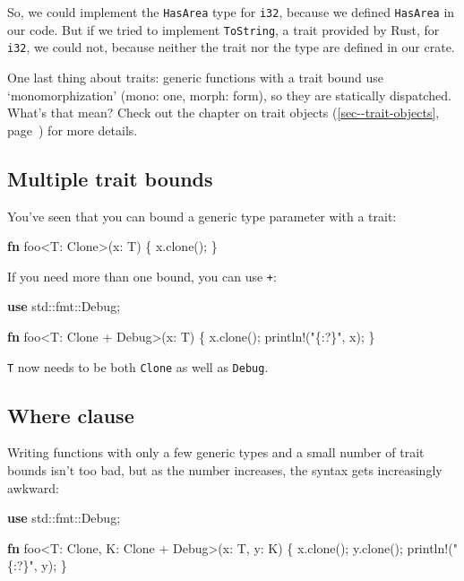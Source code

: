 \documentclass[a4paper,]{book}
\renewcommand*{\hyperref}[2][\ar]{%
  \def\ar{#2}%
  #2 (\autoref{#1}, page~\pageref{#1})}
\newenvironment{Shaded}{\begin{snugshade}}{\end{snugshade}}
\newcommand{\KeywordTok}[1]{\textcolor[rgb]{0.13,0.29,0.53}{\textbf{{#1}}}}
\newcommand{\StringTok}[1]{\textcolor[rgb]{0.31,0.60,0.02}{{#1}}}
\newcommand{\OtherTok}[1]{\textcolor[rgb]{0.56,0.35,0.01}{{#1}}}
\newcommand{\NormalTok}[1]{{#1}}
\begin{document}
So, we could implement the \texttt{HasArea} type for \texttt{i32},
because we defined \texttt{HasArea} in our code. But if we tried to
implement \texttt{ToString}, a trait provided by Rust, for \texttt{i32},
we could not, because neither the trait nor the type are defined in our
crate.

One last thing about traits: generic functions with a trait bound use
`monomorphization' (mono: one, morph: form), so they are statically
dispatched. What's that mean? Check out the chapter on
\hyperref[sec--trait-objects]{trait objects} for more details.

\subsection{Multiple trait bounds}\label{multiple-trait-bounds}

You've seen that you can bound a generic type parameter with a trait:

\begin{Shaded}
\begin{Highlighting}[]
\KeywordTok{fn} \NormalTok{foo<T: Clone>(x: T) \{}
    \NormalTok{x.clone();}
\NormalTok{\}}
\end{Highlighting}
\end{Shaded}

If you need more than one bound, you can use \texttt{+}:

\begin{Shaded}
\begin{Highlighting}[]
\KeywordTok{use} \NormalTok{std::fmt::Debug;}

\KeywordTok{fn} \NormalTok{foo<T: Clone + Debug>(x: T) \{}
    \NormalTok{x.clone();}
    \OtherTok{println!}\NormalTok{(}\StringTok{"\{:?\}"}\NormalTok{, x);}
\NormalTok{\}}
\end{Highlighting}
\end{Shaded}

\texttt{T} now needs to be both \texttt{Clone} as well as
\texttt{Debug}.

\subsection{Where clause}\label{where-clause}

Writing functions with only a few generic types and a small number of
trait bounds isn't too bad, but as the number increases, the syntax gets
increasingly awkward:

\begin{Shaded}
\begin{Highlighting}[]
\KeywordTok{use} \NormalTok{std::fmt::Debug;}

\KeywordTok{fn} \NormalTok{foo<T: Clone, K: Clone + Debug>(x: T, y: K) \{}
    \NormalTok{x.clone();}
    \NormalTok{y.clone();}
    \OtherTok{println!}\NormalTok{(}\StringTok{"\{:?\}"}\NormalTok{, y);}
\NormalTok{\}}
\end{Highlighting}
\end{Shaded}
\end{document}
